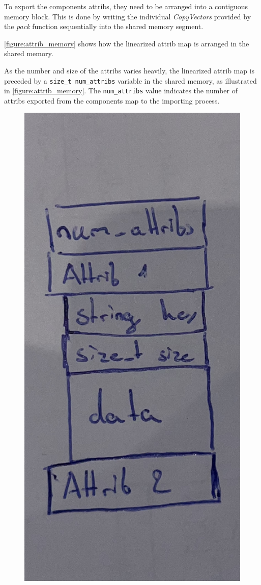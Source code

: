 To export the components attribs, they need to be arranged into a contiguous memory block.
This is done by writing the individual \emph{CopyVectors} provided by the \emph{pack} function sequentially into the shared memory segment.

\autoref{figure:attrib_memory} shows how the linearized attrib map is arranged in the shared memory.

As the number and size of the attribs varies heavily, the linearized attrib map is preceded by a \lstinline|size_t num_attribs| variable in the shared memory,
as illustrated in \autoref{figure:attrib_memory}.
The \lstinline|num_attribs| value indicates the number of attribs exported from the components map to the importing process.

\begin{figure}[!ht]
    \includegraphics[scale=0.1]{images/attrib_memory.jpg} %

\end{figure}

